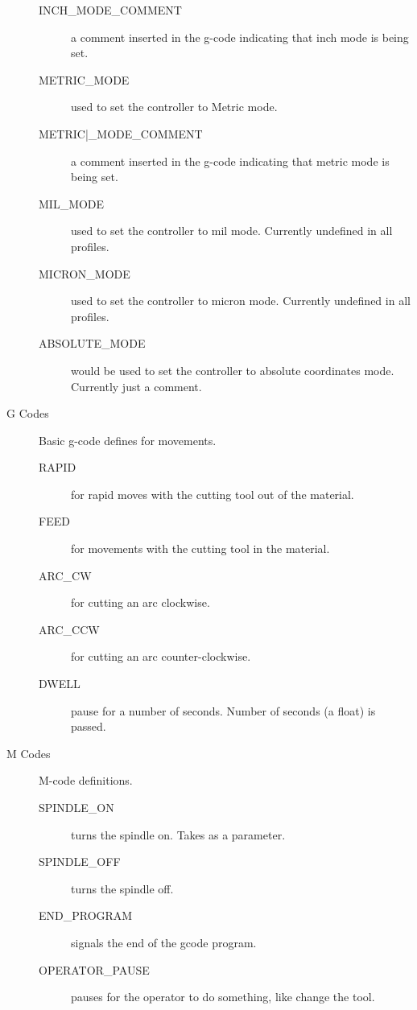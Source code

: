 \documentclass[11pt]{book}
\begin{document}
\begin{description}
\begin{description}
    \item[INCH\_{}MODE\_{}COMMENT] a comment inserted in the g-code indicating that inch mode is being set.
    
    \item[METRIC\_{}MODE] used to set the controller to Metric mode.
    
    \item[METRIC|\_{}MODE\_{}COMMENT] a comment inserted in the g-code indicating that metric mode is being set.
    
    \item[MIL\_{}MODE] used to set the controller to mil mode. Currently undefined in all profiles.
    
    \item[MICRON\_{}MODE] used to set the controller to micron mode. Currently undefined in all profiles.
    
    \item[ABSOLUTE\_{}MODE] would be used to set the controller to absolute coordinates mode. Currently just a comment.
\end{description}

\item[G Codes] Basic g-code defines for movements.
\begin{description}
    \item[RAPID] for rapid moves with the cutting tool out of the material.
    \item[FEED] for movements with the cutting tool in the material.
    \item[ARC\_{}CW] for cutting an arc clockwise.
    \item[ARC\_{}CCW] for cutting an arc counter-clockwise.
    \item[DWELL] pause for a number of seconds. Number of seconds (a float) is passed.
\end{description}

\item[M Codes] M-code definitions.
\begin{description}
	\item[SPINDLE\_{}ON] turns the spindle on. Takes  as a parameter.
	\item[SPINDLE\_{}OFF] turns the spindle off.
	\item[END\_{}PROGRAM] signals the end of the gcode program.
	\item[OPERATOR\_{}PAUSE] pauses for the operator to do something, like change the tool.
\end{description}


\end{description}
\end{document}
